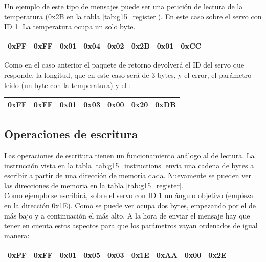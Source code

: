 	Un ejemplo de este tipo de mensajes puede ser una petición de lectura de la temperatura (0x2B en la tabla \ref{tab:g15_register}). En este caso sobre el servo con ID 1. La temperatura ocupa un solo byte.
		
	\begin{center}
		\begin{tabular}{|c|c|c|c|c|c|c|c|}
			\hline
			0xFF & 0xFF & 0x01 & 0x04 & 0x02 & 0x2B & 0x01 & 0xCC \\
			\hline
		\end{tabular}
	\end{center}
	
	Como en el caso anterior el paquete de retorno devolverá el ID del servo que responde, la longitud, que en este caso será de 3 bytes, y el error, el parámetro leido (un byte con la temperatura) y el :
	
	\begin{center}
		\begin{tabular}{|c|c|c|c|c|c|c|}
			\hline
			0xFF & 0xFF & 0x01 & 0x03 & 0x00 & 0x20 & 0xDB \\
			\hline
		\end{tabular}
	\end{center}
	
	\subsection{Operaciones de escritura} \label{subsec:registros:operaciones:escritura}
	
	Las operaciones de escritura tienen un funcionamiento análogo al de lectura. La instrucción  vista en la tabla \ref{tab:g15_instructions} envía una cadena de bytes a escribir a partir de una dirección de memoria dada. Nuevamente se pueden ver las direcciones de memoria en la tabla \ref{tab:g15_register}.
	\\ 
	
	Como ejemplo se escribirá, sobre el servo con ID 1 un ángulo objetivo (empieza en la dirección 0x1E). Como se puede ver ocupa dos bytes, empezando por el de más bajo y a continuación el más alto. A la hora de enviar el mensaje hay que tener en cuenta estos aspectos para que los parámetros vayan ordenados de igual manera:
	
	\begin{center}
		\begin{tabular}{|c|c|c|c|c|c|c|c|c|}
			\hline
			0xFF & 0xFF & 0x01 & 0x05 & 0x03 & 0x1E & 0xAA & 0x00 &0x2E  \\
			\hline
		\end{tabular}
	\end{center}
	
